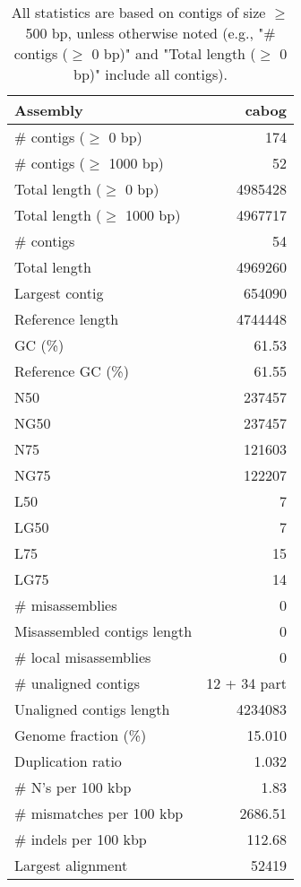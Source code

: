 \documentclass[12pt,a4paper]{article}
\begin{document}
\begin{table}[ht]
\begin{center}
\caption{All statistics are based on contigs of size $\geq$ 500 bp, unless otherwise noted (e.g., "\# contigs ($\geq$ 0 bp)" and "Total length ($\geq$ 0 bp)" include all contigs).}
\begin{tabular}{|l*{1}{|r}|}
\hline
Assembly & cabog \\ \hline
\# contigs ($\geq$ 0 bp) & 174 \\ \hline
\# contigs ($\geq$ 1000 bp) & 52 \\ \hline
Total length ($\geq$ 0 bp) & 4985428 \\ \hline
Total length ($\geq$ 1000 bp) & 4967717 \\ \hline
\# contigs & 54 \\ \hline
Total length & 4969260 \\ \hline
Largest contig & 654090 \\ \hline
Reference length & 4744448 \\ \hline
GC (\%) & 61.53 \\ \hline
Reference GC (\%) & 61.55 \\ \hline
N50 & 237457 \\ \hline
NG50 & 237457 \\ \hline
N75 & 121603 \\ \hline
NG75 & 122207 \\ \hline
L50 & 7 \\ \hline
LG50 & 7 \\ \hline
L75 & 15 \\ \hline
LG75 & 14 \\ \hline
\# misassemblies & 0 \\ \hline
Misassembled contigs length & 0 \\ \hline
\# local misassemblies & 0 \\ \hline
\# unaligned contigs & 12 + 34 part \\ \hline
Unaligned contigs length & 4234083 \\ \hline
Genome fraction (\%) & 15.010 \\ \hline
Duplication ratio & 1.032 \\ \hline
\# N's per 100 kbp & 1.83 \\ \hline
\# mismatches per 100 kbp & 2686.51 \\ \hline
\# indels per 100 kbp & 112.68 \\ \hline
Largest alignment & 52419 \\ \hline
\end{tabular}
\end{center}
\end{table}
\end{document}
